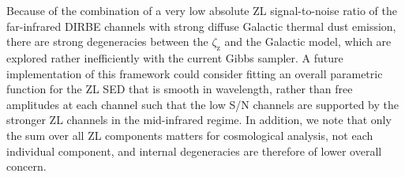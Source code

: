 \documentclass[twocolumn]{aa}
\begin{document}
Because of the combination of a very low absolute ZL signal-to-noise ratio of the
far-infrared DIRBE channels with strong diffuse Galactic thermal dust
emission, there are strong degeneracies between the
$\zeta_{\mathrm{z}}$ and the Galactic model, which are explored
rather inefficiently with the current Gibbs sampler. A future
implementation of this framework could consider fitting an overall
parametric function for the ZL SED that is smooth in wavelength,
rather than free amplitudes at each channel such that the low S/N
channels are supported by the stronger ZL channels in the mid-infrared
regime. 
In addition, we note that only the sum over all ZL
components matters for cosmological analysis, not each individual
component, and internal degeneracies are therefore of lower overall
concern.

\end{document}
